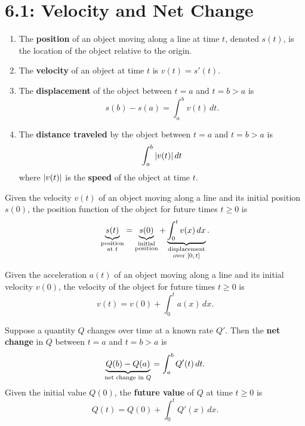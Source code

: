 \documentclass[../mathNotesPreamble]{subfiles}
\begin{document}
\section{6.1: Velocity and Net Change}

  \begin{defn*}
    \begin{enumerate}
      \item 
        The \textbf{position} of an object moving along a line at time $t$, denoted $s(t)$, is the location of the object relative to the origin.
      \item 
        The \textbf{velocity} of an object at time $t$ is $v(t)=s'(t)$.
      \item 
        The \textbf{displacement} of the object between $t=a$ and $t=b>a$ is
          \[s(b)-s(a)=\int_a^b v(t)\,dt.\]
      \item 
        The \textbf{distance traveled} by the object between $t=a$ and $t=b>a$ is
          \[\int_a^b{\left\vert v(t)\right\vert}\,dt\]
        where ${\left\vert v(t)\right\vert}$ is the \textbf{speed} of the object at time $t$.
    \end{enumerate}
  \end{defn*}

  \begin{thmBox*}
    Given the velocity $v(t)$ of an object moving along a line and its initial position $s(0)$, the position function of the object for future times $t\geq 0$ is
      \[\underbrace{s(t)}_{\substack{\textnormal{position}\\ \textnormal{at $t$}}}=\underbrace{s(0)}_{\substack{\textnormal{initial}\\\textnormal{position}}}+\underbrace{\int_0^t v(x)\,dx}_{\substack{\textnormal{displacement}\\\textnormal{over ${\left[0,t\right]}$}}}.\]
  \end{thmBox*}

  \begin{thmBox*}
    Given the acceleration $a(t)$ of an object moving along a line and its initial velocity $v(0)$, the velocity of the object for future times $t\geq 0$ is
      \[v(t)=v(0)+\int_0^t a(x)\,dx.\]
  \end{thmBox*}

  \begin{thmBox*}
    Suppose a quantity $Q$ changes over time at a known rate $Q'$. Then the \textbf{net change} in $Q$ between $t=a$ and $t=b>a$ is
      \[\underbrace{Q(b)-Q(a)}_{\textnormal{net change in }Q}=\int_a^b Q'(t)\,dt.\]
    Given the initial value $Q(0)$, the \textbf{future value} of $Q$ at time $t\geq 0$ is
      \[Q(t)=Q(0)+\int_0^t Q'(x)\,dx.\]
  \end{thmBox*}
\end{document}

